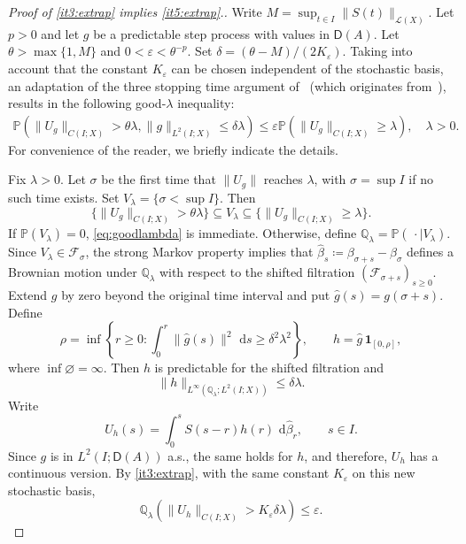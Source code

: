 \documentclass[11pt]{amsart}
\theoremstyle{definition}
\theoremstyle{remark}
\numberwithin{equation}{section}
\newcommand{\F}{\mathscr F}
\renewcommand{\P}{\mathbb P}
\newcommand{\1}{\mathbf 1}
\newcommand{\cD}{\mathsf D}
\newcommand{\norm}[1]{\lVert #1\rVert}
\newcommand{\dd}{\,\mathrm d}
\newcommand{\one}{\1}
\begin{document}
\begin{proof}[Proof of \ref{it3:extrap} implies \ref{it5:extrap}.]
Write $M = \sup_{t \in I}\norm{S(t)}_{\mathscr{L}(X)}$. Let $p>0$ and let $g$ be a predictable step process with values in $\cD(A)$.  Let $\theta > \max\{1,M\}$ and $0 < \varepsilon < \theta^{-p}$. Set $\delta =(\theta - M)/ (2K_{\varepsilon})$.
Taking into account that the constant $K_{\varepsilon}$ can be chosen independent of the stochastic basis, an adaptation of the three stopping time argument of~\cite[Lemma 3.5]{coxvw2024sharp} (which originates from~\cite{Burkholder1973}), results in the following good-$\lambda$ inequality:
\begin{align}\label{eq:goodlambda}
    \P(\norm{U_g}_{C(I;X)} > \theta \lambda, \norm{g}_{L^2(I;X)} \leq \delta \lambda) \leq \varepsilon \P(\norm{U_g}_{C(I;X)} \geq \lambda), \quad \lambda > 0.
\end{align}
For convenience of the reader, we briefly indicate the details. 

Fix $\lambda>0$. Let $\sigma$ be the first time that
$\norm{U_g}$ reaches $\lambda$, with $\sigma= \sup I$ if no such time exists. Set $V_{\lambda}= \{\sigma<\sup I\}$. 
Then
\[
    \{\norm{U_g}_{C(I;X)}>\theta\lambda\}\subseteq V_{\lambda}
    \subseteq \{\norm{U_g}_{C(I;X)}\geq\lambda\}.
\]
If $\P(V_{\lambda})=0$, \eqref{eq:goodlambda} is immediate.
Otherwise, define $\mathbb Q_\lambda=\P(\,\cdot\mid V_{\lambda})$.
Since $V_\lambda\in\F_\sigma$, the strong Markov property implies that
$\widehat\beta_s\coloneq\beta_{\sigma+s}-\beta_\sigma$
defines a Brownian motion under $\mathbb Q_\lambda$ with respect to the
shifted filtration $(\F_{\sigma+s})_{s\geq0}$.
Extend $g$ by zero beyond the original time interval and put
$\widehat g(s)=g(\sigma+s)$. Define
\[
    \rho=\inf\left\{
        r\geq0:
        \int_0^r\norm{\widehat g(s)}^2\,\dd s
        \geq\delta^2\lambda^2
    \right\},
    \qquad
    h=\widehat g\,\one_{[0,\rho]},
\]
where $\inf\varnothing=\infty$. Then $h$ is predictable for the
shifted filtration and
\[
    \norm{h}_{L^\infty(\mathbb Q_\lambda;L^2(I;X))}
    \leq\delta\lambda.
\]
Write
\[
    U_h(s)=\int_0^s S(s-r)h(r)\,\dd\widehat\beta_r,
    \qquad s\in I.
\]
Since $g$ is in $L^2(I;\cD(A))$ a.s., the same holds for $h$, and therefore, $U_h$ has a continuous version. By \ref{it3:extrap}, with the same constant $K_\varepsilon$ on this
new stochastic basis,
\[
    \mathbb Q_\lambda\left(
        \norm{U_h}_{C(I;X)}
        >K_\varepsilon\delta\lambda
    \right)\leq\varepsilon.
\]


\end{proof}
\end{document}

